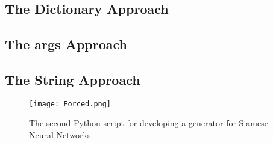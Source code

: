 \documentclass[
	letterpaper, %
	10pt, %
	unnumberedsections, %
	twoside, %
]{LTJournalArticle}
\begin{document}

% 
% 
% 
% 
% 

\subsection{The Dictionary Approach}
 
\subsection{The \*args Approach}

\subsection{The String Approach}


\begin{figure*}[hbt!] %
	\centering
    \texttt{[image: Forced.png]}
	\caption{The second Python script for developing a generator for Siamese Neural Networks.}
	\label{fig:directory_dataset_generator}
\end{figure*}

\subsection{}


% 
% 
% 
%          
% 
\end{document}
